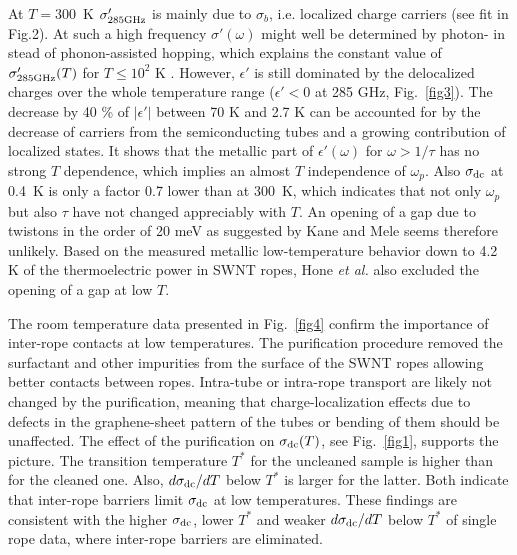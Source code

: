 \begin{multicols}{2}
At $T=300$~K $\sigma'_{\rm 285 GHz}$ is mainly due to $\sigma_b$, i.e.
localized charge carriers (see fit in Fig.2). At such a high frequency
$\sigma'(\omega)$ might well be determined by photon- in stead of
phonon-assisted hopping\cite{Boettger85,Reedijk98}, which explains the
constant value of $\sigma'_{\rm 285 GHz}(T)$ for $T \le 10^2$ K .
However, $\epsilon'$ is still dominated by the delocalized charges over the
whole temperature range ($\epsilon'<0$ at 285 GHz, Fig.~\ref{fig3}). The
decrease by 40 \% of $|\epsilon'|$ between 70 K and 2.7 K can be accounted
for by the decrease of carriers from the semiconducting tubes and a growing
contribution of localized states. It shows that the metallic part of
$\epsilon'(\omega)$ for $\omega>1/\tau$ has no strong $T$ dependence, which
implies an almost $T$ independence of $\omega_p$. Also $\sigma_{\rm dc}$
at 0.4~K is only a factor 0.7 lower than at 300~K, which indicates
that not only $\omega_p$ but also $\tau$ have not changed appreciably with
$T$. An opening of a gap due to twistons in the order of 20 meV as suggested
by Kane and Mele\cite{Kane97} seems therefore unlikely. Based on the
measured metallic low-temperature behavior down to 4.2 K of the
thermoelectric power in SWNT ropes, Hone {\it et al.}\cite{Hone98} also
excluded the opening of a gap at low $T$\cite{n1}.

The room temperature data presented in Fig.~\ref{fig4} confirm the importance
of inter-rope contacts at low temperatures. The purification procedure
removed the surfactant and other impurities from the surface of the
SWNT ropes allowing better contacts between ropes. Intra-tube or
intra-rope transport are likely not changed by the purification,
meaning that charge-localization effects due to defects in the
graphene-sheet pattern of the tubes or bending of them should be
unaffected. The effect of the purification on $\sigma_{\rm dc}(T)$, see
Fig.~\ref{fig1}, supports the picture. The transition temperature $T^*$ for
the uncleaned sample is higher than for the cleaned one. Also, $d\sigma_{\rm dc}/ dT$ below $T^*$ is larger for the latter. Both indicate that inter-rope
barriers limit $\sigma_{\rm dc}$ at low temperatures. These findings are
consistent with the higher $\sigma_{\rm dc}$, lower $T^*$ and
weaker $d\sigma_{\rm dc}/ dT$ below $T^*$\cite{Fischer97} of
single rope data, where inter-rope barriers are eliminated.


\end{multicols}
